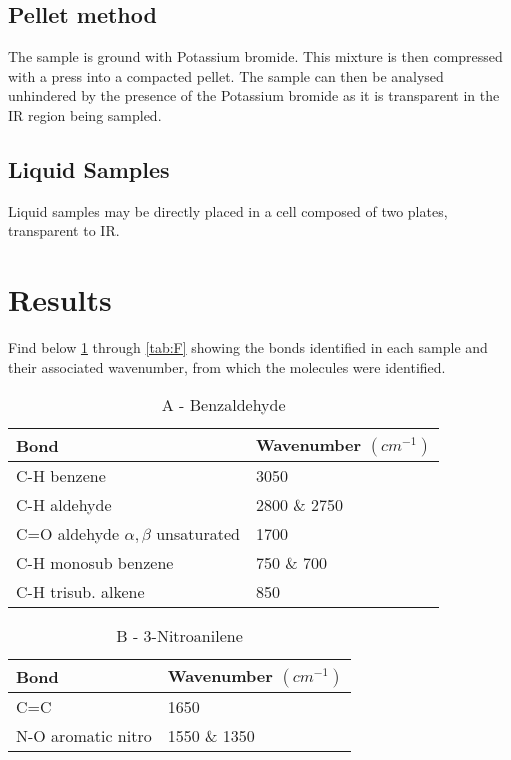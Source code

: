 \documentclass[a4paper, british]{article}
\begin{document}
\subsection*{Pellet method}

The sample is ground with Potassium bromide. This mixture is then compressed with a press into a compacted pellet. The sample can then be analysed unhindered by the presence of the Potassium bromide as it is transparent in the IR region being sampled.\cite{harwoodExperimentalOrganicChemistry1990}

\subsection*{Liquid Samples}

Liquid samples may be directly placed in a cell composed of two plates, transparent to IR.


\section{Results}

Find below \cref{tab:A} through \cref{tab:F} showing the bonds identified in each sample and their associated wavenumber, from which the molecules were identified.\cite{InfraredSpectroscopyCorrelation2022}\cite{larkinInfraredRamanSpectroscopy2011}\cite{socratesInfraredRamanCharacteristic2010}

\begin{table}[H]
    \centering
    \caption{A - Benzaldehyde}
    \vspace*{2mm}
    \label{tab:A}
    \begin{tabular}{ll}
    \toprule
    Bond                         & Wavenumber \((cm^{-1})\)       \\ \midrule
    C-H benzene                  & 3050         \\
    C-H aldehyde                 & 2800 \& 2750 \\
    C=O aldehyde \(\alpha, \beta\) unsaturated & 1700         \\
    C-H monosub benzene          & 750 \& 700   \\
    C-H trisub. alkene           & 850          \\ \bottomrule
    \end{tabular}
\end{table}

\begin{table}[H]
    \centering
    \caption{B - 3-Nitroanilene}
    \vspace*{2mm}
    \label{tab:B}
    \begin{tabular}{ll}
    \toprule
    Bond                         & Wavenumber \((cm^{-1})\)       \\ \midrule
    C=C                          & 1650         \\
    N-O aromatic nitro           & 1550 \& 1350 \\
    \bottomrule
    \end{tabular}
\end{table}
\end{document}
